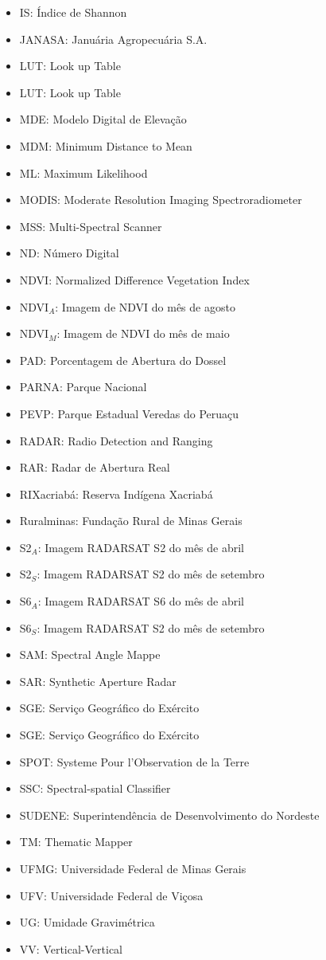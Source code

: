 \documentclass[
    oneside,
    a4paper,
    12pt
]{book}
\begin{document}
\begin{itemize}
    \item IS: Índice de Shannon
    \item JANASA: Januária Agropecuária S.A.
    \item LUT: Look up Table
    \item LUT: Look up Table
    \item MDE: Modelo Digital de Elevação
    \item MDM: Minimum Distance to Mean
    \item ML: Maximum Likelihood
    \item MODIS: Moderate Resolution Imaging Spectroradiometer
    \item MSS: Multi-Spectral Scanner
    \item ND: Número Digital
    \item NDVI: Normalized Difference Vegetation Index
    \item NDVI$_{A}$: Imagem de NDVI do mês de agosto
    \item NDVI$_{M}$: Imagem de NDVI do mês de maio
    \item PAD: Porcentagem de Abertura do Dossel
    \item PARNA: Parque Nacional
    \item PEVP: Parque Estadual Veredas do Peruaçu
    \item RADAR: Radio Detection and Ranging
    \item RAR: Radar de Abertura Real
    \item RIXacriabá: Reserva Indígena Xacriabá
    \item Ruralminas: Fundação Rural de Minas Gerais
    \item S2$_{A}$: Imagem RADARSAT S2 do mês de abril
    \item S2$_{S}$: Imagem RADARSAT S2 do mês de setembro
    \item S6$_{A}$: Imagem RADARSAT S6 do mês de abril
    \item S6$_{S}$: Imagem RADARSAT S2 do mês de setembro
    \item SAM: Spectral Angle Mappe
    \item SAR: Synthetic Aperture Radar
    \item SGE: Serviço Geográfico do Exército
    \item SGE: Serviço Geográfico do Exército
    \item SPOT: Systeme Pour l'Observation de la Terre
    \item SSC: Spectral-spatial Classifier
    \item SUDENE: Superintendência de Desenvolvimento do Nordeste
    \item TM: Thematic Mapper
    \item UFMG: Universidade Federal de Minas Gerais
    \item UFV: Universidade Federal de Viçosa
    \item UG: Umidade Gravimétrica
    \item VV: Vertical-Vertical
\end{itemize}
\end{document}
